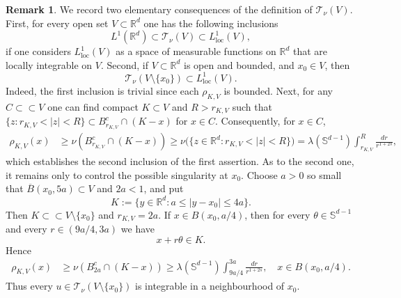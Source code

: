 \documentclass[11pt,a4paper,reqno]{amsart}
\theoremstyle{definition}
\newtheorem{remark}[theorem]{Remark}
\numberwithin{equation}{section}
\begin{document}
\begin{remark}
\label{rem.incl123}
We record two elementary consequences of the definition of
$\mathscr T_\nu(V)$.
First, for every open set $V\subset \mathbb R^d$ one has the following inclusions
\[
L^1(\mathbb R^d)\subset  \mathscr T_\nu(V)\subset L^1_{\mathrm{loc}}(V),
\]
if one considers $L^1_{\mathrm{loc}}(V)$ as a space of measurable functions  on  $\mathbb R^d$
that are locally integrable on $V$. Second, if $V\subset\mathbb R^d$ is open and bounded, and  $x_0\in V$, then
\[
\mathscr T_\nu(V\setminus\{x_0\})\subset L^1_{\mathrm{loc}}(V).
\]
Indeed, the first inclusion is trivial since each $\rho_{K,V}$ is bounded.
Next, for any $C\subset\subset  V$ one can find compact $K\subset V$ and 
$R>r_{K,V}$ such that $\{z: r_{K,V}<|z|<R\}\subset B^c_{r_{K,V}}\cap (K-x)$ for $x\in C$.
Consequently, for $x\in C$,
\[
\begin{split}
\rho_{K,V}(x)&\ge \nu(B^c_{r_{K,V}}\cap (K-x))\ge \nu\bigl(\{z\in\mathbb R^d:r_{K,V}<|z|<R\}\bigr)=\lambda(\mathbb S^{d-1})\int_{r_{K,V}}^{R}\frac{dr}{r^{1+2s}}, 
\end{split}
\]
which establishes the second inclusion of the first assertion. 
As to the second one, it remains only to control the possible singularity at $x_0$. Choose
$a>0$ so small that $\overline B(x_0,5a)\subset V$ and $2a<1$, and put
\[
        K:=\{y\in\mathbb R^d: a\le |y-x_0|\le 4a\}.
\]
Then $K\subset\subset V\setminus\{x_0\}$ and $r_{K,V}=2a$. 
If $x\in B(x_0,a/4)$, then for every $\theta\in\mathbb S^{d-1}$ and every
$r\in(9a/4,3a)$ we have
\[
x+r\theta\in K.
\]
Hence
\[
\begin{split}
\rho_{K,V}(x)&\ge \nu(B^c_{2a}\cap (K-x))\ge\lambda(\mathbb S^{d-1})\int_{9a/4}^{3a}\frac{dr}{r^{1+2s}},\quad x\in B(x_0,a/4).
\end{split}
\]
Thus every $u\in\mathscr T_\nu(V\setminus\{x_0\})$ is integrable in a
neighbourhood of $x_0$. 
\end{remark}
\end{document}
